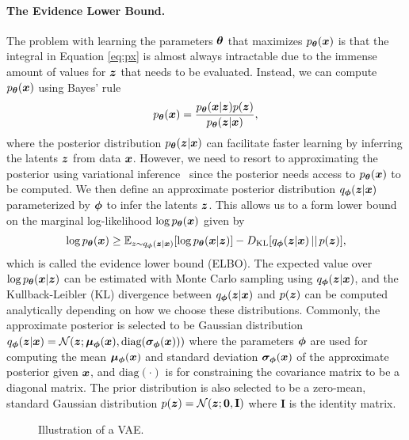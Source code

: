 \vspace{-3mm}
\paragraph{The Evidence Lower Bound.} The problem with learning the parameters ${\bm{\theta}}$ that maximizes $p_{{\bm{\theta}}}({\bm{x}})$ is that the integral in Equation \ref{eq:px} is almost always intractable due to the immense amount of values for ${\bm{z}}$ that needs to be evaluated. Instead, we can compute $p_{{\bm{\theta}}}({\bm{x}})$ using Bayes' rule 
\begin{equation}
	p_{{\bm{\theta}}}({\bm{x}}) = \frac{p_{{\bm{\theta}}}({\bm{x}} | {\bm{z}}) p({\bm{z}}) }{p_{{\bm{\theta}}}({\bm{z}} | {\bm{x}})},
\end{equation}
where the posterior distribution $p_{{\bm{\theta}}}({\bm{z}} | {\bm{x}})$ can facilitate faster learning by inferring the latents ${\bm{z}}$ from data ${\bm{x}}$. However, we need to resort to approximating the posterior using variational inference~\cite{zhang2018advances,blei2017variational} since the posterior needs access to $p_{{\bm{\theta}}}({\bm{x}})$ to be computed. We then define an approximate posterior distribution $q_{{\bm{\phi}}}({\bm{z}} | {\bm{x}})$ parameterized by ${\bm{\phi}}$ to infer the latents ${\bm{z}}$. This allows us to a form lower bound on the marginal log-likelihood $\log p_{{\bm{\theta}}}({\bm{x}})$ given by 
\begin{align}\label{eq:elbo}
	\log p_{{\bm{\theta}}}({\bm{x}}) \geq \mathbb{E}_{z \sim q_{{\bm{\phi}}}({\bm{z}} | {\bm{x}})}[\log p_{{\bm{\theta}}}({\bm{x}} | {\bm{z}})] - D_{\mathrm{KL}}[q_{{\bm{\phi}}}({\bm{z}} |  {\bm{x}}) \, || \, p({\bm{z}})] ,
\end{align}
which is called the evidence lower bound (ELBO). The expected value over $\log p_{{\bm{\theta}}}({\bm{x}} | {\bm{z}})$ can be estimated with Monte Carlo sampling using $q_{{\bm{\phi}}}({\bm{z}} | {\bm{x}})$, and the Kullback-Leibler (KL) divergence between $q_{{\bm{\phi}}}({\bm{z}} |  {\bm{x}})$ and $p({\bm{z}})$ can be computed analytically depending on how we choose these distributions. Commonly, the approximate posterior is selected to be Gaussian distribution $q_{{\bm{\phi}}}({\bm{z}} | {\bm{x}}) = {\mathcal{N}}({\bm{z}}; {\bm{\mu}}_{{\bm{\phi}}}({\bm{x}}), \text{diag}({\bm{\sigma}}_{{\bm{\phi}}}({\bm{x}})))$ where the parameters ${\bm{\phi}}$ are used for computing the mean ${\bm{\mu}}_{{\bm{\phi}}}({\bm{x}})$ and standard deviation ${\bm{\sigma}}_{{\bm{\phi}}}({\bm{x}})$ of the approximate posterior given ${\bm{x}}$, and $\text{diag}(\cdot)$ is for constraining the covariance matrix to be a diagonal matrix. The prior distribution is also selected to be a zero-mean, standard Gaussian distribution $p({\bm{z}}) = {\mathcal{N}}({\bm{z}}; \mathbf{0}, \mathbf{I})$ where $\mathbf{I}$ is the identity matrix. 

\begin{figure}[t]
	\centering
	\resizebox{0.6\textwidth}{!}{
		
	}
	\caption{Illustration of a VAE. 
	}
	\label{fig:vae}
	\vspace{-3mm}
\end{figure}

